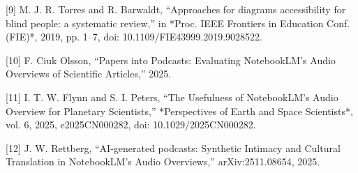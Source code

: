 [9] M. J. R. Torres and R. Barwaldt, “Approaches for diagrams accessibility for blind people: a systematic review,” in *Proc. IEEE Frontiers in Education Conf. (FIE)*, 2019, pp. 1–7, doi: 10.1109/FIE43999.2019.9028522.

[10] F. Ciuk Olsson, “Papers into Podcasts: Evaluating NotebookLM’s Audio Overviews of Scientific Articles,” 2025.

[11] I. T. W. Flynn and S. I. Peters, “The Usefulness of NotebookLM’s Audio Overview for Planetary Scientists,” *Perspectives of Earth and Space Scientists*, vol. 6, 2025, e2025CN000282, doi: 10.1029/2025CN000282.

[12] J. W. Rettberg, “AI-generated podcasts: Synthetic Intimacy and Cultural Translation in NotebookLM’s Audio Overviews,” arXiv:2511.08654, 2025.

